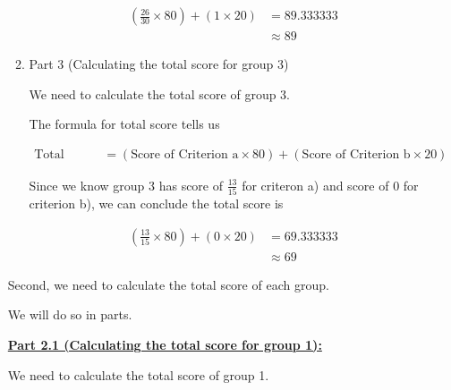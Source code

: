 \documentclass[12pt]{article}
\begin{document}
\begin{mdframed}
\begin{itemize}
\begin{enumerate}[1.]
\begin{mdframed}
                \begin{align}
                    (\frac{26}{30} \times 80) + (1 \times 20) &= 89.333333\\
                    &\approx 89
                \end{align}
            \end{mdframed}

            \item Part 3 (Calculating the total score for group 3)

            \begin{mdframed}
                We need to calculate the total score of group 3.

                \bigskip

                The formula for total score tells us

                \begin{align}
                    \text{Total Score} &= (\text{Score of Criterion a} \times 80) + (\text{Score of Criterion b} \times 20)
                \end{align}

                \bigskip

                Since we know group 3 has score of $\frac{13}{15}$ for criteron a) and score of $0$ for
                criterion b), we can conclude the total score is

                \begin{align}
                    (\frac{13}{15} \times 80) + (0 \times 20) &= 69.333333\\
                    &\approx 69
                \end{align}
            \end{mdframed}
        \end{enumerate}

        \begin{mdframed}

            Second, we need to calculate the total score of each group.

            \bigskip

            We will do so in parts.

            \bigskip

            \underline{\textbf{Part 2.1 (Calculating the total score for group 1):}}

            \bigskip

            We need to calculate the total score of group 1.


\end{mdframed}
\end{itemize}
\end{mdframed}
\end{document}
